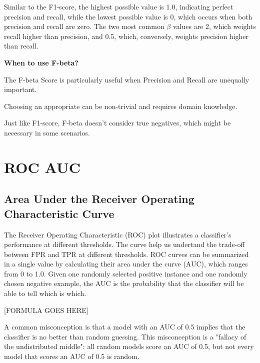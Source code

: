 Similar to the F1-score, the highest possible value is 1.0, indicating perfect precision and recall, while the lowest possible value is 0, which occurs when both precision and recall are zero.
The two most common $\beta$ values are 2, which weights recall higher than precision, and 0.5, which, conversely, weights precision higher than recall.

\textbf{When to use F-beta?}

The F-beta Score is particularly useful when Precision and Recall are unequally important.

{
\item Choosing an appropriate can be non-trivial and requires domain knowledge.
\item Just like F1-score, F-beta doesn't consider true negatives, which might be necessary in some scenarios.
}

\clearpage
\thispagestyle{classificationstyle}
\section{ROC AUC}
\subsection{Area Under the Receiver Operating Characteristic Curve}

The Receiver Operating Characteristic (ROC) plot illustrates a classifier's performance at different thresholds. The curve help us undertand the trade-off between FPR
and TPR at different thresholds. ROC curves can be summarized in a single value by calculating their area under the curve (AUC), which ranges from 0 to 1.0.
Given one randomly selected positive instance and one randomly chosen negative example, the AUC is the probability that the classifier will be able to tell which is which.

\begin{center}
    [FORMULA GOES HERE]
\end{center}

A common misconception is that a model with an AUC of 0.5 implies that the classifier is no better than random guessing. This misconception is a "fallacy of the undistributed middle":
all random models score an AUC of 0.5, but not every model that scores an AUC of 0.5 is random.

